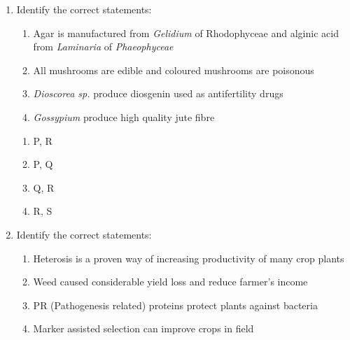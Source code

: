 \documentclass[journal,12pt,onecolumn]{IEEEtran}
\begin{document}
\begin{enumerate}
\item Identify the correct statements:  
\begin{enumerate}[label=\Alph*:,start=16]
\item Agar is manufactured from \textit{Gelidium} of Rhodophyceae and alginic acid from \textit{Laminaria} of \textit{Phaeophyceae}
\item All mushrooms are edible and coloured mushrooms are poisonous
\item \textit{Dioscorea sp.} produce diosgenin used as antifertility drugs
\item \textit{Gossypium} produce high quality jute fibre
\end{enumerate}

\begin{multicols}{2}
\begin{enumerate}[label=(\Alph*)]
\item P, R
\item P, Q
\item Q, R
\item R, S
\end{enumerate}
\end{multicols}

\item Identify the correct statements:  
\begin{enumerate}[label=\Alph*:,start=16]
\item Heterosis is a proven way of increasing productivity of many crop plants
\item Weed caused considerable yield loss and reduce farmer’s income
\item PR (Pathogenesis related) proteins protect plants against bacteria
\item Marker assisted selection can improve crops in field
\end{enumerate}


\end{enumerate}
\end{document}
